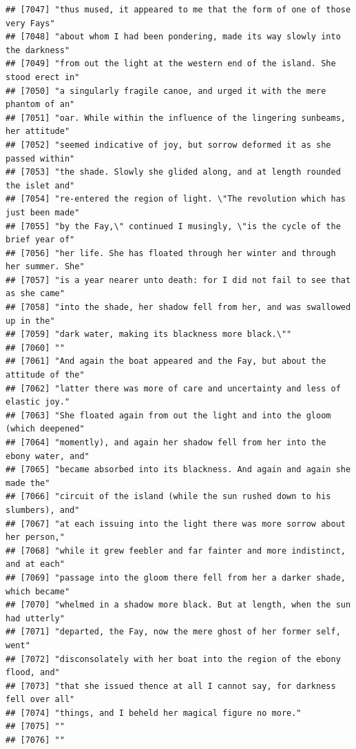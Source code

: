 \documentclass{article}\usepackage[]{graphicx}\usepackage[]{color}
\makeatletter
\newenvironment{kframe}{%
 \def\at@end@of@kframe{}%
 \ifinner\ifhmode%
  \def\at@end@of@kframe{\end{minipage}}%
  \begin{minipage}{\columnwidth}%
 \fi\fi%
 \def\FrameCommand##1{\hskip\@totalleftmargin \hskip-\fboxsep
 \colorbox{shadecolor}{##1}\hskip-\fboxsep
     \hskip-\linewidth \hskip-\@totalleftmargin \hskip\columnwidth}%
 \MakeFramed {\advance\hsize-\width
   \@totalleftmargin\z@ \linewidth\hsize
   \@setminipage}}%
 {\par\unskip\endMakeFramed%
 \at@end@of@kframe}
\newenvironment{knitrout}{}{} %
\makeatother
\begin{document}
\begin{knitrout}
\begin{kframe}
\begin{verbatim}
## [7047] "thus mused, it appeared to me that the form of one of those very Fays"       
## [7048] "about whom I had been pondering, made its way slowly into the darkness"      
## [7049] "from out the light at the western end of the island. She stood erect in"     
## [7050] "a singularly fragile canoe, and urged it with the mere phantom of an"        
## [7051] "oar. While within the influence of the lingering sunbeams, her attitude"     
## [7052] "seemed indicative of joy, but sorrow deformed it as she passed within"       
## [7053] "the shade. Slowly she glided along, and at length rounded the islet and"     
## [7054] "re-entered the region of light. \"The revolution which has just been made"   
## [7055] "by the Fay,\" continued I musingly, \"is the cycle of the brief year of"     
## [7056] "her life. She has floated through her winter and through her summer. She"    
## [7057] "is a year nearer unto death: for I did not fail to see that as she came"     
## [7058] "into the shade, her shadow fell from her, and was swallowed up in the"       
## [7059] "dark water, making its blackness more black.\""                              
## [7060] ""                                                                            
## [7061] "And again the boat appeared and the Fay, but about the attitude of the"      
## [7062] "latter there was more of care and uncertainty and less of elastic joy."      
## [7063] "She floated again from out the light and into the gloom (which deepened"     
## [7064] "momently), and again her shadow fell from her into the ebony water, and"     
## [7065] "became absorbed into its blackness. And again and again she made the"        
## [7066] "circuit of the island (while the sun rushed down to his slumbers), and"      
## [7067] "at each issuing into the light there was more sorrow about her person,"      
## [7068] "while it grew feebler and far fainter and more indistinct, and at each"      
## [7069] "passage into the gloom there fell from her a darker shade, which became"     
## [7070] "whelmed in a shadow more black. But at length, when the sun had utterly"     
## [7071] "departed, the Fay, now the mere ghost of her former self, went"              
## [7072] "disconsolately with her boat into the region of the ebony flood, and"        
## [7073] "that she issued thence at all I cannot say, for darkness fell over all"      
## [7074] "things, and I beheld her magical figure no more."                            
## [7075] ""                                                                            
## [7076] ""                                                                            

\end{verbatim}
\end{kframe}
\end{knitrout}
\end{document}
